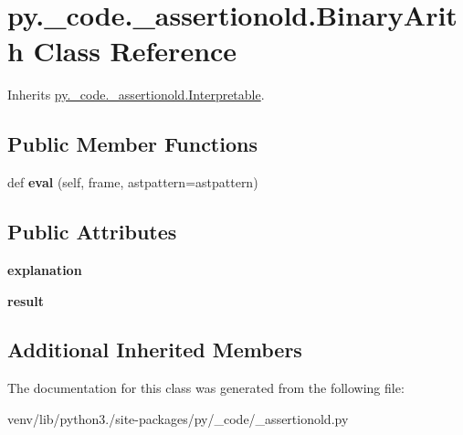 \hypertarget{classpy_1_1__code_1_1__assertionold_1_1_binary_arith}{}\section{py.\+\_\+code.\+\_\+assertionold.\+Binary\+Arith Class Reference}
\label{classpy_1_1__code_1_1__assertionold_1_1_binary_arith}


Inherits \hyperlink{classpy_1_1__code_1_1__assertionold_1_1_interpretable}{py.\+\_\+code.\+\_\+assertionold.\+Interpretable}.

\subsection*{Public Member Functions}
\begin{DoxyCompactItemize}
\item 
\mbox{\label{classpy_1_1__code_1_1__assertionold_1_1_binary_arith_a06a3e9ce8fa8a611d0bcb935db80f943}} 
def {\bfseries eval} (self, frame, astpattern=astpattern)
\end{DoxyCompactItemize}
\subsection*{Public Attributes}
\begin{DoxyCompactItemize}
\item 
\mbox{\label{classpy_1_1__code_1_1__assertionold_1_1_binary_arith_ae8e59064a580780face915a212059def}} 
{\bfseries explanation}
\item 
\mbox{\label{classpy_1_1__code_1_1__assertionold_1_1_binary_arith_a3da41ca93de3bd03e143a83bfb907762}} 
{\bfseries result}
\end{DoxyCompactItemize}
\subsection*{Additional Inherited Members}


The documentation for this class was generated from the following file\+:\begin{DoxyCompactItemize}
\item 
venv/lib/python3./site-\/packages/py/\+\_\+code/\+\_\+assertionold.\+py\end{DoxyCompactItemize}
